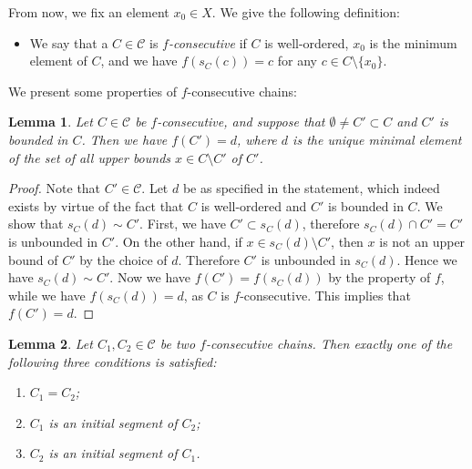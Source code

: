 \documentclass{article}
\newtheorem{lemma}{Lemma}
\begin{document}
From now, we fix an element $x_0 \in X$.
We give the following definition:
\begin{itemize}
\item We say that a $C \in \mathcal{C}$ is \emph{$f$-consecutive} if $C$ is well-ordered, $x_0$ is the minimum element of $C$, and we have $f(s_C(c)) = c$ for any $c \in C \setminus \{x_0\}$.
\end{itemize}
We present some properties of $f$-consecutive chains:
\begin{lemma}
\label{lem:saturated_then_closed}
Let $C \in \mathcal{C}$ be $f$-consecutive, and suppose that $\emptyset \neq C' \subset C$ and $C'$ is bounded in $C$.
Then we have $f(C') = d$, where $d$ is the unique minimal element of the set of all upper bounds $x \in C \setminus C'$ of $C'$.
\end{lemma}
\begin{proof}
Note that $C' \in \mathcal{C}$.
Let $d$ be as specified in the statement, which indeed exists by virtue of the fact that $C$ is well-ordered and $C'$ is bounded in $C$.
We show that $s_C(d) \sim C'$.
First, we have $C' \subset s_C(d)$, therefore $s_C(d) \cap C' = C'$ is unbounded in $C'$.
On the other hand, if $x \in s_C(d) \setminus C'$, then $x$ is not an upper bound of $C'$ by the choice of $d$.
Therefore $C'$ is unbounded in $s_C(d)$.
Hence we have $s_C(d) \sim C'$.
Now we have $f(C') = f(s_C(d))$ by the property of $f$, while we have $f(s_C(d)) = d$, as $C$ is $f$-consecutive.
This implies that $f(C') = d$.
\end{proof}
\begin{lemma}
\label{lem:trichotomy}
Let $C_1,C_2 \in \mathcal{C}$ be two $f$-consecutive chains.
Then exactly one of the following three conditions is satisfied:
\begin{enumerate}
\item $C_1 = C_2$;
\item $C_1$ is an initial segment of $C_2$;
\item $C_2$ is an initial segment of $C_1$.
\end{enumerate}
\end{lemma}
\end{document}
